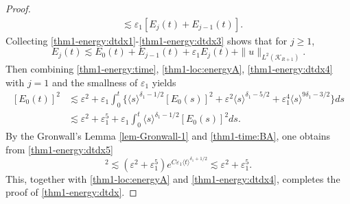 \documentclass[11pt,twoside]{article}
\def\cK{\mathcal K}
\def\ve{\varepsilon}
\def\ls{\lesssim}
\newcommand{\w}[1]{\langle {#1} \rangle}
\theoremstyle{plain}
\theoremstyle{definition}
\numberwithin{equation}{section}
\begin{document}
\begin{proof}
\begin{equation}
\begin{split}
&\ls\ve_1[E_j(t)+E_{j-1}(t)].
\end{split}
\end{equation}
Collecting \eqref{thm1-energy:dtdx1}-\eqref{thm1-energy:dtdx3} shows that for $j\ge1$,
\begin{equation}\label{thm1-energy:dtdx4}
E_j(t)\ls E_0(t)+E_{j-1}(t)+\ve_1E_j(t)+\|u\|_{L^2(\cK_{R+1})}.
\end{equation}
Then combining \eqref{thm1-energy:time}, \eqref{thm1-loc:energyA}, \eqref{thm1-energy:dtdx4} with $j=1$ and the
smallness of $\ve_1$ yields
\begin{equation}\label{thm1-energy:dtdx5}
\begin{split}
[E_0(t)]^2&\ls\ve^2+\ve_1\int_0^t\{\w{s}^{\delta_1-1/2}[E_0(s)]^2+\ve^2\w{s}^{\delta_1-5/2}+\ve_1^4\w{s}^{9\delta_1-3/2}\}ds\\
&\ls\ve^2+\ve_1^5+\ve_1\int_0^t\w{s}^{\delta_1-1/2}[E_0(s)]^2ds.
\end{split}
\end{equation}
By the Gronwall's Lemma \ref{lem-Gronwall-1} and \eqref{thm1-time:BA}, one obtains from \eqref{thm1-energy:dtdx5}
\begin{equation*}
[E_0(t)]^2\ls(\ve^2+\ve_1^5)e^{C\ve_1\w{t}^{\delta_1+1/2}}\ls\ve^2+\ve_1^5.
\end{equation*}
This, together with \eqref{thm1-loc:energyA} and \eqref{thm1-energy:dtdx4}, completes the proof of \eqref{thm1-energy:dtdx}.
\end{proof}
\end{document}
